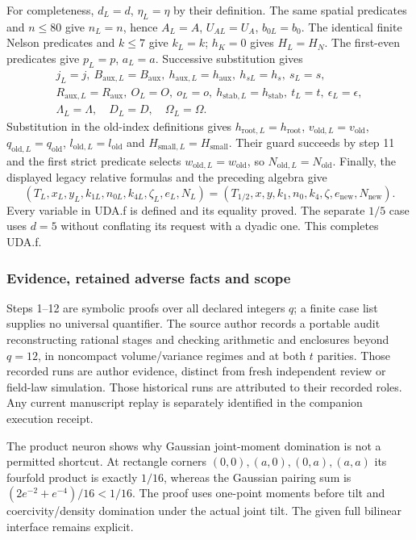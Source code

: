 \documentclass[11pt]{article}
\theoremstyle{plain}
\theoremstyle{definition}
\theoremstyle{remark}
\begin{document}
For completeness, $d_L=d$, $\eta_L=\eta$ by their definition.
The same spatial predicates and $n\le80$ give $n_L=n$, hence $A_L=A$,
$U_{AL}=U_A$, $b_{0L}=b_0$. The identical finite Nelson predicates and
$k\le7$ give $k_L=k$; $h_K=0$ gives $H_L=H_N$. The first-even predicates
give $p_L=p$, $a_L=a$. Successive substitution gives
\begin{gather*}
 j_L=j,\ B_{\mathrm{aux},L}=B_{\mathrm{aux}},\
 h_{\mathrm{aux},L}=h_{\mathrm{aux}},\ h_{sL}=h_s,\ s_L=s,\\
 R_{\mathrm{aux},L}=R_{\mathrm{aux}},\ O_L=O,\ o_L=o,\
 h_{\mathrm{stab},L}=h_{\mathrm{stab}},\ t_L=t,\ \epsilon_L=\epsilon,\\
 \Lambda_L=\Lambda,\quad D_L=D,\quad\Omega_L=\Omega.
\end{gather*}
Substitution in the old-index definitions gives
$h_{\mathrm{root},L}=h_{\mathrm{root}}$,
$v_{\mathrm{old},L}=v_{\mathrm{old}}$,
$q_{\mathrm{old},L}=q_{\mathrm{old}}$,
$l_{\mathrm{old},L}=l_{\mathrm{old}}$ and
$H_{\mathrm{small},L}=H_{\mathrm{small}}$.
Their guard succeeds by step 11 and the first strict predicate selects
$w_{\mathrm{old},L}=w_{\mathrm{old}}$, so $N_{\mathrm{old},L}=N_{\mathrm{old}}$.
Finally, the displayed legacy relative formulas and the preceding algebra give
\[
 (T_L,x_L,y_L,k_{1L},n_{0L},k_{4L},\zeta_L,e_L,N_L)
 =(T_{1/2},x,y,k_1,n_0,k_4,\zeta,e_{\mathrm{new}},N_{\mathrm{new}}).
\]
Every variable in UDA.f is defined and its equality proved. The separate
$1/5$ case uses $d=5$ without conflating its request with a dyadic one.
This completes UDA.f.

\subsubsection{Evidence, retained adverse facts and scope}
Steps 1--12 are symbolic proofs over all declared integers $q$; a finite
case list supplies no universal quantifier. The source author records a
portable audit reconstructing rational stages and checking arithmetic and
enclosures beyond $q=12$, in noncompact volume/variance regimes and at both
$t$ parities. Those recorded runs are author evidence, distinct from fresh
independent review or field-law simulation. Those historical runs are attributed to their recorded roles. Any current
manuscript replay is separately identified in the companion execution receipt.

The product neuron shows why Gaussian joint-moment domination is not a
permitted shortcut. At rectangle corners $(0,0),(a,0),(0,a),(a,a)$ its
fourfold product is exactly $1/16$, whereas the Gaussian pairing sum is
$(2e^{-2}+e^{-4})/16<1/16$. The proof uses one-point moments before
tilt and coercivity/density domination under the actual joint tilt.
The given full bilinear interface remains explicit.
\end{document}

